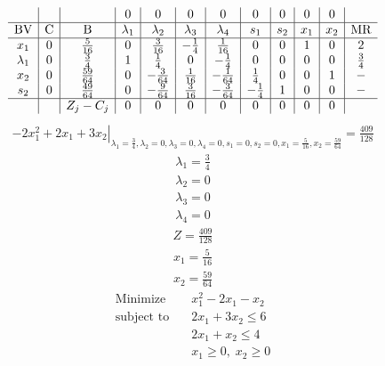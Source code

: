 \documentclass{article}
\begin{document}
\begin{align*}
\begin{array}{c|c|c|c|c|c|c|c|c|c|c|c}
 &  &  & 0 & 0 & 0 & 0 & 0 & 0 & 0 & 0 & \\
\hline
\text{BV} & \text{C} & \text{B} & \lambda_{1} & \lambda_{2} & \lambda_{3} & \lambda_{4} & s_{1} & s_{2} & x_{1} & x_{2} & \text{MR} \\
\hline
x_{1} & 0 & \frac{5}{16} & 0 & \frac{3}{16} & -\frac{1}{4} & \frac{1}{16} & 0 & 0 & 1 & 0 & 2 \\
\lambda_{1} & 0 & \frac{3}{4} & 1 & \frac{1}{4} & 0 & -\frac{1}{4} & 0 & 0 & 0 & 0 & \frac{3}{4} \\
x_{2} & 0 & \frac{59}{64} & 0 & -\frac{3}{64} & \frac{1}{16} & -\frac{1}{64} & \frac{1}{4} & 0 & 0 & 1 & - \\
s_{2} & 0 & \frac{49}{64} & 0 & -\frac{9}{64} & \frac{3}{16} & -\frac{3}{64} & -\frac{1}{4} & 1 & 0 & 0 & - \\
\hline
 &  & Z_j-C_j & 0 & 0 & 0 & 0 & 0 & 0 & 0 & 0 & \\
\end{array}
\end{align*}
\begin{align*}
\left.-2x_{1}^{2} + 2x_{1} + 3x_{2}\right|_{\lambda_{1}=\frac{3}{4},\lambda_{2}=0,\lambda_{3}=0,\lambda_{4}=0,s_{1}=0,s_{2}=0,x_{1}=\frac{5}{16},x_{2}=\frac{59}{64}}=\frac{409}{128}\end{align*}
\begin{align*}
\lambda_{1}=\frac{3}{4}\end{align*}
\begin{align*}
\lambda_{2}=0\end{align*}
\begin{align*}
\lambda_{3}=0\end{align*}
\begin{align*}
\lambda_{4}=0\end{align*}
\begin{align*}
Z=\frac{409}{128}\end{align*}
\begin{align*}
x_{1}=\frac{5}{16}\end{align*}
\begin{align*}
x_{2}=\frac{59}{64}\end{align*}
\begin{align*}
\text{Minimize} \quad & x_{1}^{2} - 2x_{1} - x_{2}\\
\text{subject to} \quad
& 2x_{1} + 3x_{2}\le6\\
& 2x_{1} + x_{2}\le4\\
& x_{1}\ge0,\; x_{2}\ge0\end{align*}
\end{document}
